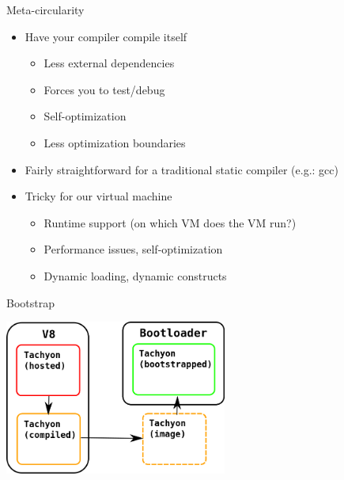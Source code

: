 \begin{frame}{Meta-circularity}
    \begin{itemize}
        \item Have your compiler compile itself
        \begin{itemize}
            \item Less external dependencies
            \item Forces you to test/debug
            \item Self-optimization
            \item Less optimization boundaries
        \end{itemize}
        \item Fairly straightforward for a traditional static compiler (e.g.: gcc)
        \item Tricky for our virtual machine
        \begin{itemize}
            \item Runtime support (on which VM does the VM run?)
            \item Performance issues, self-optimization
            \item Dynamic loading, dynamic constructs
        \end{itemize}
    \end{itemize}
\end{frame}

\begin{frame}{Bootstrap}
\begin{center}
\includegraphics[height=2in]{images/bootstrap}
\end{center}
\end{frame}


